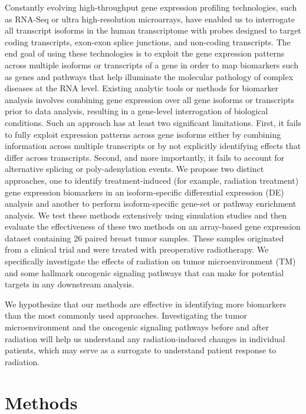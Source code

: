 \documentclass[hidelinks,11pt]{article}
\begin{document}
Constantly evolving high-throughput gene expression profiling technologies, such as RNA-Seq or ultra high-resolution microarrays, have enabled us to interrogate all transcript isoforms in the human transcriptome with probes designed to target coding transcripts, exon-exon splice junctions, and non-coding transcripts. The end goal of using these technologies is to exploit the gene expression patterns across multiple isoforms or transcripts of a gene in order to map biomarkers such as genes and pathways that help illuminate the molecular pathology of complex diseases at the RNA level. Existing analytic tools or methods for biomarker analysis involves combining gene expression over all gene isoforms or transcripts prior to data analysis, resulting in a gene-level interrogation of biological conditions. Such an approach has at least two significant limitations. First, it fails to fully exploit expression patterns across gene isoforms either by combining information across multiple transcripts or by not explicitly identifying effects that differ across transcripts. Second, and more importantly, it fails to account for alternative splicing or poly-adenylation events. We propose two distinct approaches, one to identify treatment-induced (for example, radiation treatment) gene expression biomarkers in an isoform-specific differential expression (DE) analysis and another to perform isoform-specific gene-set or pathway enrichment analysis. We test these methods extensively using simulation studies and then evaluate the effectiveness of these two methods on an array-based gene expression dataset containing 26 paired breast tumor samples. These samples originated from a clinical trial and were treated with preoperative radiotherapy. We specifically investigate the effects of radiation on tumor microenvironment (TM) and some hallmark oncogenic signaling pathways that can make for potential targets in any downstream analysis. 

We hypothesize that our methods are effective in identifying more biomarkers than the most commonly used approaches. Investigating the tumor microenvironment and the oncogenic signaling pathways before and after radiation will help us understand any radiation-induced changes in individual patients, which may serve as a surrogate to understand patient response to radiation. 

\section*{Methods}
\end{document}
